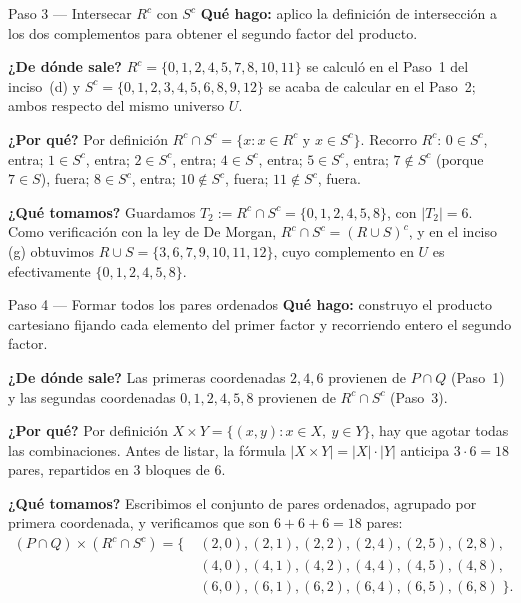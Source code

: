 \documentclass[11pt]{article}
\begin{document}
\begin{paso}{Paso 3 --- Intersecar $R^{c}$ con $S^{c}$}
\textbf{Qué hago:} aplico la definición de intersección a los dos complementos para obtener el
segundo factor del producto.

\textbf{¿De dónde sale?} $R^{c}=\{0,1,2,4,5,7,8,10,11\}$ se calculó en el Paso~1 del
inciso~(d) y $S^{c}=\{0,1,2,3,4,5,6,8,9,12\}$ se acaba de calcular en el Paso~2; ambos
respecto del mismo universo $U$.

\textbf{¿Por qué?} Por definición $R^{c}\cap S^{c}=\{x: x\in R^{c} \text{ y } x\in S^{c}\}$.
Recorro $R^{c}$: $0\in S^{c}$, entra; $1\in S^{c}$, entra; $2\in S^{c}$, entra; $4\in S^{c}$,
entra; $5\in S^{c}$, entra; $7\notin S^{c}$ (porque $7\in S$), fuera; $8\in S^{c}$, entra;
$10\notin S^{c}$, fuera; $11\notin S^{c}$, fuera.

\textbf{¿Qué tomamos?} Guardamos $T_2:=R^{c}\cap S^{c}=\{0,1,2,4,5,8\}$, con $|T_2|=6$. Como
verificación con la ley de De Morgan, $R^{c}\cap S^{c}=(R\cup S)^{c}$, y en el inciso (g)
obtuvimos $R\cup S=\{3,6,7,9,10,11,12\}$, cuyo complemento en $U$ es efectivamente
$\{0,1,2,4,5,8\}$.
\end{paso}

\begin{paso}{Paso 4 --- Formar todos los pares ordenados}
\textbf{Qué hago:} construyo el producto cartesiano fijando cada elemento del primer factor y
recorriendo entero el segundo factor.

\textbf{¿De dónde sale?} Las primeras coordenadas $2,4,6$ provienen de $P\cap Q$ (Paso~1) y
las segundas coordenadas $0,1,2,4,5,8$ provienen de $R^{c}\cap S^{c}$ (Paso~3).

\textbf{¿Por qué?} Por definición $X\times Y=\{(x,y): x\in X,\ y\in Y\}$, hay que agotar todas
las combinaciones. Antes de listar, la fórmula $|X\times Y|=|X|\cdot|Y|$ anticipa
$3\cdot 6=18$ pares, repartidos en $3$ bloques de $6$.

\textbf{¿Qué tomamos?} Escribimos el conjunto de pares ordenados, agrupado por primera
coordenada, y verificamos que son $6+6+6=18$ pares:
\begin{align*}
(P\cap Q)\times(R^{c}\cap S^{c})=\bigl\{\;
&(2,0),(2,1),(2,2),(2,4),(2,5),(2,8),\\
&(4,0),(4,1),(4,2),(4,4),(4,5),(4,8),\\
&(6,0),(6,1),(6,2),(6,4),(6,5),(6,8)\;\bigr\}.
\end{align*}
\end{paso}
\end{document}
